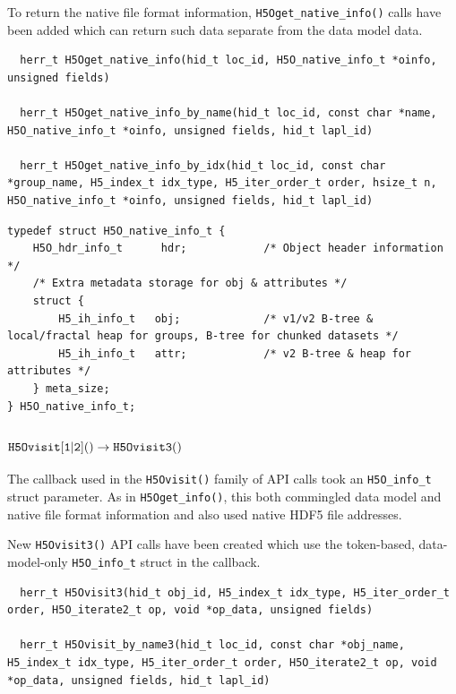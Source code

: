 To return the native file format information, {\tt H5Oget\_native\_info()} calls
have been added which can return such data separate from the data model data.

\begin{lstlisting}
  herr_t H5Oget_native_info(hid_t loc_id, H5O_native_info_t *oinfo, unsigned fields)

  herr_t H5Oget_native_info_by_name(hid_t loc_id, const char *name, H5O_native_info_t *oinfo, unsigned fields, hid_t lapl_id)

  herr_t H5Oget_native_info_by_idx(hid_t loc_id, const char *group_name, H5_index_t idx_type, H5_iter_order_t order, hsize_t n, H5O_native_info_t *oinfo, unsigned fields, hid_t lapl_id)
\end{lstlisting}

\begin{lstlisting}
typedef struct H5O_native_info_t {                                               
    H5O_hdr_info_t      hdr;            /* Object header information */          
    /* Extra metadata storage for obj & attributes */                            
    struct {                                                                     
        H5_ih_info_t   obj;             /* v1/v2 B-tree & local/fractal heap for groups, B-tree for chunked datasets */
        H5_ih_info_t   attr;            /* v2 B-tree & heap for attributes */    
    } meta_size;                                                                 
} H5O_native_info_t;
\end{lstlisting}


\subsubsection{${\tt H5Ovisit[1|2]()} \rightarrow {\tt H5Ovisit3()}$}

The callback used in the {\tt H5Ovisit()} family of API calls took an {\tt H5O\_info\_t}
struct parameter. As in {\tt H5Oget\_info()}, this both commingled data model and
native file format information and also used native HDF5 file addresses.

New {\tt H5Ovisit3()} API calls have been created which use the token-based,
data-model-only {\tt H5O\_info\_t} struct in the callback.

\begin{lstlisting}
  herr_t H5Ovisit3(hid_t obj_id, H5_index_t idx_type, H5_iter_order_t order, H5O_iterate2_t op, void *op_data, unsigned fields)

  herr_t H5Ovisit_by_name3(hid_t loc_id, const char *obj_name, H5_index_t idx_type, H5_iter_order_t order, H5O_iterate2_t op, void *op_data, unsigned fields, hid_t lapl_id)
\end{lstlisting}

